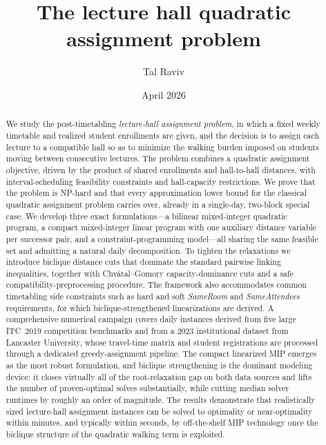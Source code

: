 \documentclass[11pt]{article}
\title{The lecture hall quadratic assignment problem}
\author{Tal Raviv}
\date{April 2026}
\begin{document}
\maketitle

\begin{abstract}
We study the post-timetabling \emph{lecture-hall assignment problem}, in which a fixed weekly timetable and realized student enrollments are given, and the decision is to assign each lecture to a compatible hall so as to minimize the walking burden imposed on students moving between consecutive lectures. The problem combines a quadratic assignment objective, driven by the product of shared enrollments and hall-to-hall distances, with interval-scheduling feasibility constraints and hall-capacity restrictions. We prove that the problem is NP-hard and that every approximation lower bound for the classical quadratic assignment problem carries over, already in a single-day, two-block special case. We develop three exact formulations---a bilinear mixed-integer quadratic program, a compact mixed-integer linear program with one auxiliary distance variable per successor pair, and a constraint-programming model---all sharing the same feasible set and admitting a natural daily decomposition. To tighten the relaxations we introduce biclique distance cuts that dominate the standard pairwise linking inequalities, together with Chv\'atal--Gomory capacity-dominance cuts and a safe compatibility-preprocessing procedure. The framework also accommodates common timetabling side constraints such as hard and soft \emph{SameRoom} and \emph{SameAttendees} requirements, for which biclique-strengthened linearizations are derived. A comprehensive numerical campaign covers daily instances derived from five large ITC~2019 competition benchmarks and from a 2023 institutional dataset from Lancaster University, whose travel-time matrix and student registrations are processed through a dedicated greedy-assignment pipeline. The compact linearized MIP emerges as the most robust formulation, and biclique strengthening is the dominant modeling device: it closes virtually all of the root-relaxation gap on both data sources and lifts the number of proven-optimal solves substantially, while cutting median solver runtimes by roughly an order of magnitude. The results demonstrate that realistically sized lecture-hall assignment instances can be solved to optimality or near-optimality within minutes, and typically within seconds, by off-the-shelf MIP technology once the biclique structure of the quadratic walking term is exploited.
\end{abstract}
\end{document}
